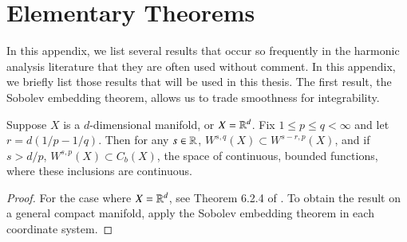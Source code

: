 
\renewcommand{\thechapter}{A}
\chapter{Elementary Theorems}

In this appendix, we list several results that occur so frequently in the harmonic analysis literature that they are often used without comment. In this appendix, we briefly list those results that will be used in this thesis. The first result, the Sobolev embedding theorem, allows us to trade smoothness for integrability.

\begin{theorem}
    Suppose $X$ is a $d$-dimensional manifold, or $X = \operatorname{\mathbb{R}}^d$. Fix $1 \leq p \leq q < \infty$ and let $r = d(1/p - 1/q)$. Then for any $s \in \operatorname{\mathbb{R}}$, $W^{s,q}(X) \subset W^{s-r,p}(X)$, and if $s > d/p$, $W^{s,p}(X) \subset C_b(X)$, the space of continuous, bounded functions, where these inclusions are continuous.
\end{theorem}
\begin{proof}
    For the case where $X = \operatorname{\mathbb{R}}^d$, see Theorem 6.2.4 of \cite{GrafakosModern}. To obtain the result on a general compact manifold, apply the Sobolev embedding theorem in each coordinate system.
\end{proof}

\begin{comment}
\begin{theorem}[Bernstein's Inequality]
    Fix $1 \leq p \leq \infty$, $s \in \RR$, and $R > 0$. If the Fourier transform of a function $f: \RR^d \to \CC$ is supported on $\{ \xi : 0 \leq |\xi| \leq R \}$, then
    \[ \| f \|_{W^{s,p}(\RR^d)} \sim \langle R \rangle^s \| f \|_{L^p(\RR^d)}. \]%
    Similarily, suppose $X$ is a compact manifold, and $P$ is a classical, elliptic, self-adjoint operator of order one on $X$. If $f: \RR^d \to \CC$ can be written as a linear combination of eigenfunctions of $P$, whose eigenvalues are contained in the interval $[0,R]$, then
        \[ \| f \|_{W^{s,p}(X)} \sim \langle R \rangle^s \| f \|_{L^p(\RR^d)} \]
\end{theorem}
\begin{proof}
    For the result on $\RR^d$, see Proposition 5.3 of \cite{Wolff}.
\end{proof}
\end{comment}

